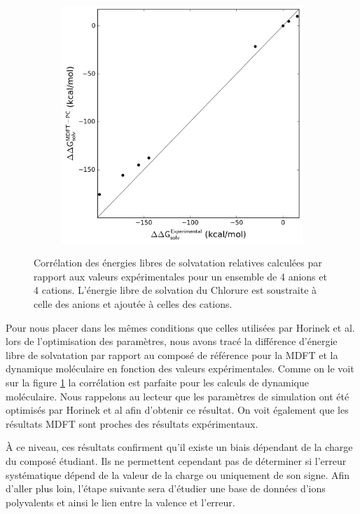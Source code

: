 \begin{figure}[ht]
\begin{subfigure}[b]{0.49\textwidth}
{         \includegraphics[width=\textwidth]{chapters/BDD/images/ions_mmax3/correlation__delta__mdft_energy_pc__vs__expt}
}
    \end{subfigure}
  \caption[Corrélation des énergies libres de solvatation relatives calculées par rapport aux valeurs expérimentales pour les ions.]{Corrélation des énergies libres de solvatation relatives calculées par rapport aux valeurs expérimentales pour un ensemble de 4 anions et 4 cations. L'énergie libre de solvation du Chlorure est soustraite à celle des anions et ajoutée à celles des cations.}
  \label{fig:correlation_ions_delta}
\end{figure}
Pour nous placer dans les mêmes conditions que celles utilisées par Horinek et al. lors de l'optimisation des paramètres, nous avons tracé la différence d'énergie libre de solvatation par rapport au composé de référence pour la MDFT et la dynamique moléculaire en fonction des valeurs expérimentales.
Comme on le voit sur la figure \ref{fig:correlation_ions_delta} la corrélation est parfaite pour les calculs de dynamique moléculaire. Nous rappelons au lecteur que les paramètres de simulation ont été optimisés par Horinek et al afin d'obtenir ce résultat.
On voit également que les résultats MDFT sont proches des résultats expérimentaux. 

À ce niveau, ces résultats confirment qu'il existe un biais dépendant de la charge du composé étudiant. Ils ne permettent cependant pas de déterminer si l'erreur systématique dépend de la valeur de la charge ou uniquement de son signe. Afin d'aller plus loin, l'étape suivante sera d'étudier une base de données d'ions polyvalents et ainsi le lien entre la valence et l'erreur.









